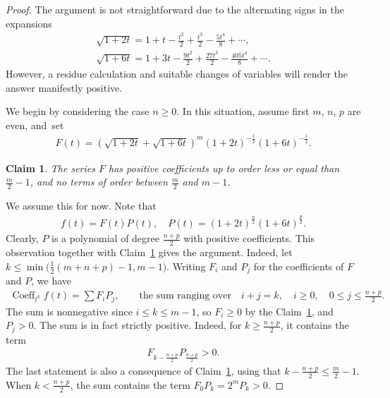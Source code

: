 \documentclass[11pt]{article}
\numberwithin{equation}{section}
\numberwithin{equation}{section}
\newtheorem{Claim}[Theorem]{Claim}
\begin{document}
\begin{proof}
The argument is not straightforward due to the alternating signs
in the expansions
\begin{gather*}
\sqrt{1+2t}= 1+t - \frac{t^2}{2}+\frac{t^3}{2}-\frac{5t^4}{8}+\cdots,
\\
\sqrt{1+6t}=1 + 3t - \frac{9t^2}{2}+\frac{27t^3}{2} - \frac{405 t^4}{8} +\cdots.
\end{gather*}
However, a residue calculation and suitable changes of variables will render the answer manifestly positive.

We begin by considering the case $n\geq 0$. In this situation, assume first $m$, $n$, $p$ are even, and~set
\begin{gather*}
F(t)=\left(\sqrt{1+2t}+\sqrt{1+6t}\right)^m {(1+2t)}^{-\frac{1}{2}} (1+6t)^{-\frac{1}{2}}.
\end{gather*}

\begin{Claim}\label{claim}
The series $F$ has positive coefficients up to order less or equal than $\frac{m}{2}-1$, and no terms of order between $\frac{m}{2}$ and $m-1$.
\end{Claim}


We assume this for now. Note that
\begin{gather*}
f(t)=F(t) P(t), \quad P(t)=(1+2t)^{\frac{n}{2}} (1+6t)^{\frac{p}{2}}.
\end{gather*}
Clearly, $P$ is a polynomial of degree $\frac{n+p}{2}$ with positive coefficients. This observation together with Claim~\ref{claim} gives the argument. Indeed, let $k\leq \min\big(\frac{1}{2}(m+n+p)-1, m-1\big)$. Writing $F_i$ and $P_j$ for the coefficients of $F$ and $P$, we have
\begin{gather*}
\operatorname{Coeff}_{ t^k} f(t)=\sum F_iP_j, \qquad\text{the sum ranging over}\quad i+j=k, \quad i\geq 0,\quad 0\leq j\leq \frac{n+p}{2}.
\end{gather*}
The sum is nonnegative since $i\leq k\leq m-1$, so $F_i\geq 0$ by the Claim~\ref{claim}, and $P_j> 0$. The sum is in fact strictly positive. Indeed, for $k\geq \frac{n+p}{2}$, it contains the term
\begin{gather*}
F_{k-\frac{n+p}{2}} P_{\frac{n+p}{2}}>0.
\end{gather*}
The last statement is also a consequence of Claim~\ref{claim}, using that $k-\frac{n+p}{2}\leq\frac{m}{2}-1$. When $k<\frac{n+p}{2}$, the sum contains the term $F_0 P_k=2^m P_k>0$.


\end{proof}
\end{document}
